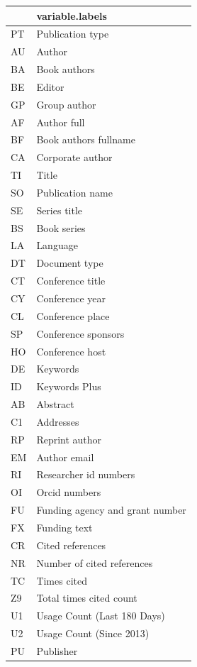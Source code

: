 \documentclass[
]{book}
\begin{document}
\begin{tabular}{l|l}
\hline
  & variable.labels\\
\hline
PT & Publication type\\
\hline
AU & Author\\
\hline
BA & Book authors\\
\hline
BE & Editor\\
\hline
GP & Group author\\
\hline
AF & Author full\\
\hline
BF & Book authors fullname\\
\hline
CA & Corporate author\\
\hline
TI & Title\\
\hline
SO & Publication name\\
\hline
SE & Series title\\
\hline
BS & Book series\\
\hline
LA & Language\\
\hline
DT & Document type\\
\hline
CT & Conference title\\
\hline
CY & Conference year\\
\hline
CL & Conference place\\
\hline
SP & Conference sponsors\\
\hline
HO & Conference host\\
\hline
DE & Keywords\\
\hline
ID & Keywords Plus\\
\hline
AB & Abstract\\
\hline
C1 & Addresses\\
\hline
RP & Reprint author\\
\hline
EM & Author email\\
\hline
RI & Researcher id numbers\\
\hline
OI & Orcid numbers\\
\hline
FU & Funding agency and grant number\\
\hline
FX & Funding text\\
\hline
CR & Cited references\\
\hline
NR & Number of cited references\\
\hline
TC & Times cited\\
\hline
Z9 & Total times cited count\\
\hline
U1 & Usage Count (Last 180 Days)\\
\hline
U2 & Usage Count (Since 2013)\\
\hline
PU & Publisher\\

\end{tabular}
\end{document}
